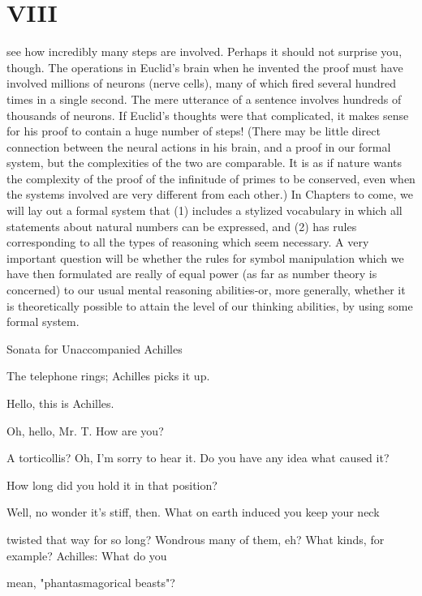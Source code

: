 \chapter {VIII}
see how incredibly many steps are involved. Perhaps it should not surprise you, though. The operations in Euclid's brain when he invented the proof must have involved millions of neurons (nerve cells), many of which fired several hundred times in a single second. The mere utterance of a sentence involves hundreds of thousands of neurons. If Euclid's thoughts were that complicated, it makes sense for his proof to contain a huge number of steps! (There may be little direct connection between the neural actions in his brain, and a proof in our formal system, but the complexities of the two are comparable. It is as if nature wants the complexity of the proof of the infinitude of primes to be conserved, even when the systems involved are very different from each other.) In Chapters to come, we will lay out a formal system that (1) includes a stylized vocabulary in which all statements about natural numbers can be expressed, and (2) has rules corresponding to all the types of reasoning which seem necessary. A very important question will be whether the rules for symbol manipulation which we have then formulated are really of equal power (as far as number theory is concerned) to our usual mental reasoning abilities-or, more generally, whether it is theoretically possible to attain the level of our thinking abilities, by using some formal system. 







Sonata for Unaccompanied Achilles 

The telephone rings; Achilles picks it up. 


\achilles Hello, this is Achilles.\par

\achilles Oh, hello, Mr. T. How are you?\par

\achilles A torticollis? Oh, I'm sorry to hear it. Do you have any idea what caused it?\par

\achilles How long did you hold it in that position?\par

\achilles Well, no wonder it's stiff, then. What on earth induced you keep your neck\par
twisted that way for so long? 
\achilles Wondrous many of them, eh? What kinds, for example? Achilles: What do you\par
mean, "phantasmagorical beasts"? 

